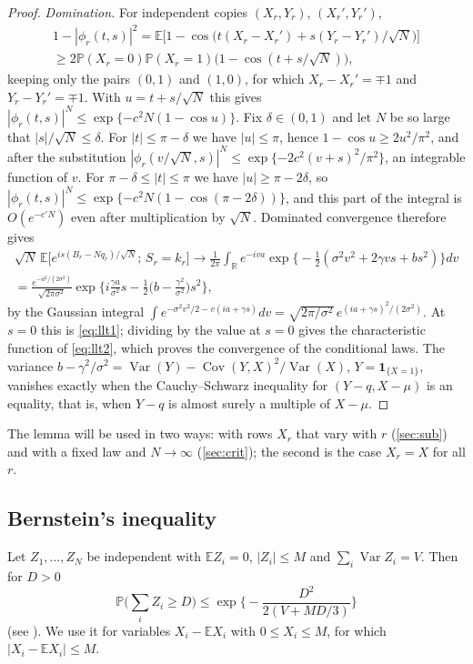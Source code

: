 \documentclass[11pt]{amsart}
\theoremstyle{definition}
\newcommand{\R}{\mathbb{R}}
\newcommand{\E}{\mathbb{E}}
\newcommand{\Prob}{\mathbb{P}}
\newcommand{\Ind}{\mathbf{1}}
\DeclareMathOperator{\Var}{Var}
\DeclareMathOperator{\Cov}{Cov}
\begin{document}
\begin{proof}
\emph{Domination.} For independent copies $(X_r,Y_r)$, $(X_r',Y_r')$,
\begin{multline*}
1-|\phi_r(t,s)|^2=\E\big[1-\cos\big(t(X_r-X_r')+s(Y_r-Y_r')/\sqrt N\big)\big]\\
\ge2\Prob(X_r=0)\Prob(X_r=1)\big(1-\cos(t+s/\sqrt N)\big),
\end{multline*}
keeping only the pairs $(0,1)$ and $(1,0)$, for which $X_r-X_r'=\mp1$ and $Y_r-Y_r'=\mp1$. With $u=t+s/\sqrt N$ this gives $|\phi_r(t,s)|^N\le\exp\{-c^2N(1-\cos u)\}$. Fix $\delta\in(0,1)$ and let $N$ be so large that $|s|/\sqrt N\le\delta$. For $|t|\le\pi-\delta$ we have $|u|\le\pi$, hence $1-\cos u\ge2u^2/\pi^2$, and after the substitution $|\phi_r(v/\sqrt N,s)|^N\le\exp\{-2c^2(v+s)^2/\pi^2\}$, an integrable function of $v$. For $\pi-\delta\le|t|\le\pi$ we have $|u|\ge\pi-2\delta$, so $|\phi_r(t,s)|^N\le\exp\{-c^2N(1-\cos(\pi-2\delta))\}$, and this part of the integral is $O(e^{-c'N})$ even after multiplication by $\sqrt N$. Dominated convergence therefore gives
\begin{multline*}
\sqrt N\,\E\Big[e^{is(B_r-Nq_r)/\sqrt N};\,S_r=k_r\Big]
\longrightarrow\frac1{2\pi}\int_\R e^{-iva}\exp\Big\{-\tfrac12(\sigma^2v^2+2\gamma vs+bs^2)\Big\}dv\\
=\frac{e^{-a^2/(2\sigma^2)}}{\sqrt{2\pi\sigma^2}}\exp\Big\{i\frac{\gamma a}{\sigma^2}s-\frac12\Big(b-\frac{\gamma^2}{\sigma^2}\Big)s^2\Big\},
\end{multline*}
by the Gaussian integral $\int e^{-\sigma^2v^2/2-v(ia+\gamma s)}dv=\sqrt{2\pi/\sigma^2}\,e^{(ia+\gamma s)^2/(2\sigma^2)}$. At $s=0$ this is \eqref{eq:llt1}; dividing by the value at $s=0$ gives the characteristic function of \eqref{eq:llt2}, which proves the convergence of the conditional laws. The variance $b-\gamma^2/\sigma^2=\Var(Y)-\Cov(Y,X)^2/\Var(X)$, $Y=\Ind_{\{X=1\}}$, vanishes exactly when the Cauchy--Schwarz inequality for $(Y-q,X-\mu)$ is an equality, that is, when $Y-q$ is almost surely a multiple of $X-\mu$.
\end{proof}

The lemma will be used in two ways: with rows $X_r$ that vary with $r$ (\cref{sec:sub}) and with a fixed law and $N\to\infty$ (\cref{sec:crit}); the second is the case $X_r=X$ for all $r$.

\subsection{Bernstein's inequality}

Let $Z_1,\dots,Z_N$ be independent with $\E Z_i=0$, $|Z_i|\le M$ and $\sum_i\Var Z_i=V$. Then for $D>0$
\begin{equation}\label{eq:bernstein}
\Prob\Big(\sum_iZ_i\ge D\Big)\le\exp\Big\{-\frac{D^2}{2(V+MD/3)}\Big\}
\end{equation}
(see \cite[Theorem 2.10]{BLM}). We use it for variables $X_i-\E X_i$ with $0\le X_i\le M$, for which $|X_i-\E X_i|\le M$.
\end{document}
